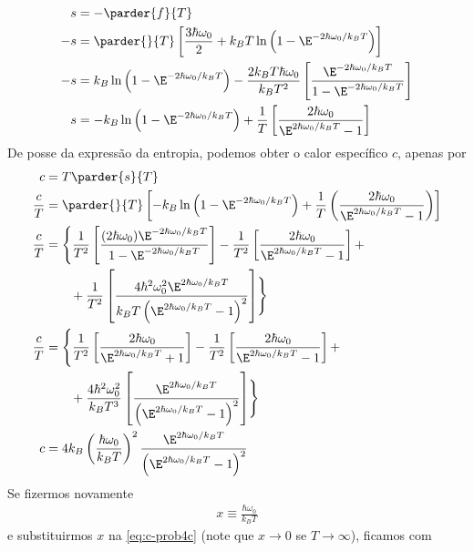 \begin{prob}
\begin{sol}
\begin{enumerate}[label=\alph *)]
\begin{align}
        \begin{split}
          s&=-\parder{f}{T}\\
          -s&=\parder{}{T}\left[\frac{3\hbar\omega_0}{2}+k_BT\ln\left(1-\E^{-2\hbar\omega_0/k_BT}\right)\right]\\
          -s&=k_B\ln\left(1-\E^{-2\hbar\omega_0/k_BT}\right)-\frac{2k_BT\hbar\omega_0}{k_BT^2}\left[\frac{\E^{-2\hbar\omega_0/k_BT}}{1-\E^{-2\hbar\omega_0/k_BT}}\right]\\
          s&=-k_B\ln\left(1-\E^{-2\hbar\omega_0/k_BT}\right)+\frac{1}{T}\left[\frac{2\hbar\omega_0}{\E^{2\hbar\omega_0/k_BT}-1}\right]
        \end{split}
      \end{align}
      De posse da expressão da entropia, podemos obter o calor específico $c$, apenas por
      \begin{align}
        \label{eq:c-prob4c}
        \begin{split}
        c&=T\parder{s}{T}\\
        \frac{c}{T}&=\parder{}{T}\left[-k_B\ln\left(1-\E^{-2\hbar\omega_0/k_BT}\right)+\frac{1}{T}\left(\frac{2\hbar\omega_0}{\E^{2\hbar\omega_0/k_BT}-1}\right)\right]\\
        \frac{c}{T}&=\Biggl\{\frac{1}{T^2}\left[\frac{(2\hbar\omega_0)\E^{-2\hbar\omega_0/k_BT}}{1-\E^{-2\hbar\omega_0/k_BT}}\right]-\frac{1}{T^2}\left[\frac{2\hbar\omega_0}{\E^{2\hbar\omega_0/k_BT}-1}\right]+\\
        &\qquad+\frac{1}{T^2}\left[\frac{4\hbar^2\omega_0^2\E^{2\hbar\omega_0/k_BT}}{k_BT\left(\E^{2\hbar\omega_0/k_BT}-1\right)^2}\right]\Biggr\}\\
        \frac{c}{T}&=\Biggl\{\frac{1}{T^2}\left[\frac{2\hbar\omega_0}{\E^{2\hbar\omega_0/k_BT}+1}\right]-\frac{1}{T^2}\left[\frac{2\hbar\omega_0}{\E^{2\hbar\omega_0/k_BT}-1}\right]+\\
        &\qquad+\frac{4\hbar^2\omega_0^2}{k_BT^3}\left[\frac{\E^{2\hbar\omega_0/k_BT}}{\left(\E^{2\hbar\omega_0/k_BT}-1\right)^2}\right]\Biggr\}\\
        c&=4k_B\left(\frac{\hbar\omega_0}{k_BT}\right)^2\frac{\E^{2\hbar\omega_0/k_BT}}{\left(\E^{2\hbar\omega_0/k_BT}-1\right)^2}
        \end{split}
      \end{align}
      Se fizermos novamente
      \begin{align}
        x\equiv \frac{\hbar\omega_0}{k_BT}
      \end{align}
      e substituirmos $x$ na \eqref{eq:c-prob4c} (note que $x\to 0$ se $T\to \infty$), ficamos com

\end{enumerate}
\end{sol}
\end{prob}
